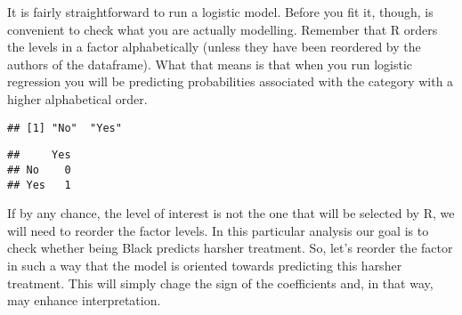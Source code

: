 \documentclass[
]{book}
\newenvironment{Shaded}{\begin{snugshade}}{\end{snugshade}}
\newcommand{\CommentTok}[1]{\textcolor[rgb]{0.56,0.35,0.01}{\textit{#1}}}
\newcommand{\FunctionTok}[1]{\textcolor[rgb]{0.13,0.29,0.53}{\textbf{#1}}}
\newcommand{\NormalTok}[1]{#1}
\newcommand{\OtherTok}[1]{\textcolor[rgb]{0.56,0.35,0.01}{#1}}
\newcommand{\SpecialCharTok}[1]{\textcolor[rgb]{0.81,0.36,0.00}{\textbf{#1}}}
\newcommand{\StringTok}[1]{\textcolor[rgb]{0.31,0.60,0.02}{#1}}
\begin{document}
It is fairly straightforward to run a logistic model. Before you fit it, though, is convenient to check what you are actually modelling. Remember that R orders the levels in a factor alphabetically (unless they have been reordered by the authors of the dataframe). What that means is that when you run logistic regression you will be predicting probabilities associated with the category with a higher alphabetical order.

\begin{Shaded}
\end{Shaded}

\begin{verbatim}
## [1] "No"  "Yes"
\end{verbatim}

\begin{Shaded}
\end{Shaded}

\begin{verbatim}
##     Yes
## No    0
## Yes   1
\end{verbatim}

If by any chance, the level of interest is not the one that will be selected by R, we will need to reorder the factor levels. In this particular analysis our goal is to check whether being Black predicts harsher treatment. So, let's reorder the factor in such a way that the model is oriented towards predicting this harsher treatment. This will simply chage the sign of the coefficients and, in that way, may enhance interpretation.

\begin{Shaded}
\end{Shaded}
\end{document}
